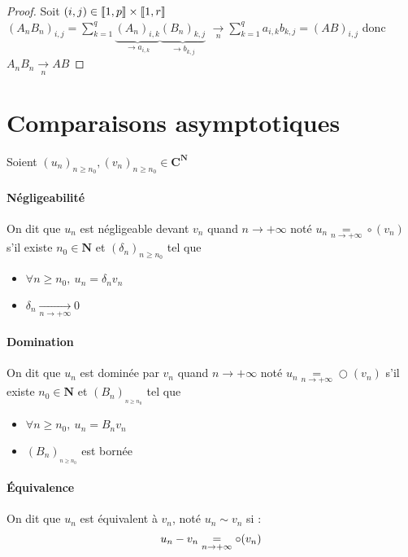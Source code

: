 		\begin{proof}
			Soit $(i,j)\in{\llbracket 1,p \rrbracket}\times{\llbracket 1,r \rrbracket}$ \\ 
			$\left(A_nB_n\right) _{i,j} = \sum_{k=1}^{q} \underbrace{\left(A_n\right)_{i,k}}_{\rightarrow a_{i,k}}
			\underbrace{\left(B_n\right)_{k,j}}_{\rightarrow b_{k,j}}$ $\underset{n}{\rightarrow} \sum_{k=1}^{q} a_{i,k}b_{k,j} = (AB)_{i,j}$ donc 
			$A_nB_n \underset{n}{\rightarrow} AB$
		\end{proof}


\section{Comparaisons asymptotiques}
	
		Soient $\left(u_n\right)_{n\geq n_0} ,\left(v_n\right)_{n\geq n_0} \in \mathbf{C}^{\mathbf{N}}$ 
		
		\vspace{-10pt}
		\traitd
		\paragraph{Négligeabilité}
			On dit que $u_n$ est négligeable devant $v_n$ quand $n\rightarrow +\infty$ noté $u_n \underset{n\rightarrow +\infty}{=} \circ (v_n)$ s'il existe $n_0 \in \mathbf{N}$ et $\left(\delta_n\right)_{n\geq n_0}$ tel que
			\begin{itemize}
				\item $\forall n\geq n_0 ,~u_n = \delta_nv_n$
				\item $\delta_n \underset{n\rightarrow +\infty}{\longrightarrow} 0$
			\end{itemize}
		\traitdouble
		\paragraph{Domination}
			On dit que $u_n$ est dominée par $v_n$ quand $n\rightarrow +\infty$ noté $u_n \underset{n\rightarrow +\infty}{=} \bigcirc (v_n)$ s'il existe $n_0 \in \mathbf{N}$ et $\left(B_n\right)_{_{n\geq n_0}}$ tel que
			\begin{itemize}
				\item $\forall n\geq n_0 ,~u_n = B_nv_n$ 
				\item $\left( B_n \right)_{_{n\geq n_0}}$ est bornée
			\end{itemize}
		\traitdouble
		\paragraph{Équivalence}
			On dit que $u_n$ est équivalent à $v_n$, noté $u_n \sim v_n$ 
			si : 
			\[
				u_n - v_n \underset{n\rightarrow +\infty}{=} \circ (v_n) 
			\vspace*{-20pt}
			\]
		\trait
		
